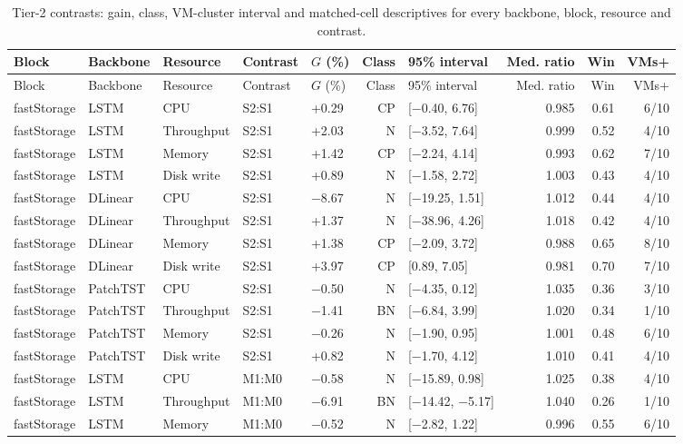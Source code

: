 \documentclass[a4paper,11pt]{article}
\begin{document}
\footnotesize
\setlength{\tabcolsep}{3pt}
\begin{longtable}{@{}lllllrlrrr@{}}
\caption{Tier-2 contrasts: gain, class, VM-cluster interval and matched-cell descriptives for every backbone, block, resource and contrast.}\label{tab:supp-t2-contrasts}\\
\toprule
Block & Backbone & Resource & Contrast & $G$ (\%) & Class & 95\% interval & Med. ratio & Win & VMs+ \\
\midrule
\endfirsthead
\toprule
Block & Backbone & Resource & Contrast & $G$ (\%) & Class & 95\% interval & Med. ratio & Win & VMs+ \\
\midrule
\endhead
\bottomrule
\endfoot
fastStorage & LSTM & CPU & S2:S1 & +0.29 & CP & [$-$0.40, 6.76] & 0.985 & 0.61 & 6/10 \\
fastStorage & LSTM & Throughput & S2:S1 & +2.03 & N & [$-$3.52, 7.64] & 0.999 & 0.52 & 4/10 \\
fastStorage & LSTM & Memory & S2:S1 & +1.42 & CP & [$-$2.24, 4.14] & 0.993 & 0.62 & 7/10 \\
fastStorage & LSTM & Disk write & S2:S1 & +0.89 & N & [$-$1.58, 2.72] & 1.003 & 0.43 & 4/10 \\
fastStorage & DLinear & CPU & S2:S1 & $-$8.67 & N & [$-$19.25, 1.51] & 1.012 & 0.44 & 4/10 \\
fastStorage & DLinear & Throughput & S2:S1 & +1.37 & N & [$-$38.96, 4.26] & 1.018 & 0.42 & 4/10 \\
fastStorage & DLinear & Memory & S2:S1 & +1.38 & CP & [$-$2.09, 3.72] & 0.988 & 0.65 & 8/10 \\
fastStorage & DLinear & Disk write & S2:S1 & +3.97 & CP & [0.89, 7.05] & 0.981 & 0.70 & 7/10 \\
fastStorage & PatchTST & CPU & S2:S1 & $-$0.50 & N & [$-$4.35, 0.12] & 1.035 & 0.36 & 3/10 \\
fastStorage & PatchTST & Throughput & S2:S1 & $-$1.41 & BN & [$-$6.84, 3.99] & 1.020 & 0.34 & 1/10 \\
fastStorage & PatchTST & Memory & S2:S1 & $-$0.26 & N & [$-$1.90, 0.95] & 1.001 & 0.48 & 6/10 \\
fastStorage & PatchTST & Disk write & S2:S1 & +0.82 & N & [$-$1.70, 4.12] & 1.010 & 0.41 & 4/10 \\
fastStorage & LSTM & CPU & M1:M0 & $-$0.58 & N & [$-$15.89, 0.98] & 1.025 & 0.38 & 4/10 \\
fastStorage & LSTM & Throughput & M1:M0 & $-$6.91 & BN & [$-$14.42, $-$5.17] & 1.040 & 0.26 & 1/10 \\
fastStorage & LSTM & Memory & M1:M0 & $-$0.52 & N & [$-$2.82, 1.22] & 0.996 & 0.55 & 6/10 \\

\end{longtable}
\end{document}
